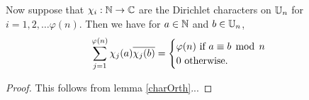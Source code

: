 \documentclass{unswmaths}
\begin{document}
    \begin{lemma}
    \label{charOrth2}
        Now suppose that $\chi_i:\mathbb{N} \rightarrow \mathbb{C}$ are the Dirichlet characters on $\mathbb{U}_n$ for $i = 1,2,\ldots \varphi(n)$. Then we have for $a \in \mathbb{N}$ and $b\in \mathbb{U}_n$,
        \begin{equation*}
            \sum_{j=1}^{\varphi(n)} \chi_j(a)\overline{\chi_j(b)} = \begin{cases}
                \varphi(n)\text{ if }a \equiv b\;\operatorname{mod}\;n\\
                0\text{ otherwise.}
            \end{cases}
        \end{equation*}
    \end{lemma}
    \begin{proof}
        This follows from lemma \ref{charOrth}...
    \end{proof}
    
\end{document}
